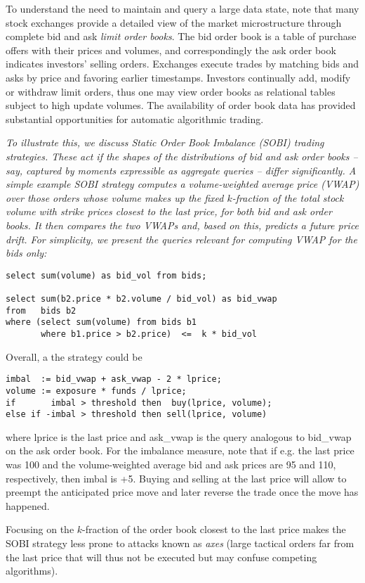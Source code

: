 To understand the need to maintain and query a large data state, note that
many stock exchanges provide a detailed view of the market microstructure
through complete bid and ask {\em limit order books}. The bid order book is a
table of purchase offers with their prices and volumes, and correspondingly the
ask order book indicates investors' selling orders. Exchanges execute trades by
matching bids and asks by price and favoring earlier timestamps. Investors
continually add, modify or withdraw limit orders, thus one may view order books
as relational tables subject to high update volumes. The availability of order
book data has provided substantial opportunities for automatic algorithmic
trading.



\begin{example}\em
To illustrate this, we discuss Static Order Book Imbalance (SOBI) trading
strategies. These act if the shapes of the distributions of bid and ask
order books -- say, captured by moments expressible as aggregate queries --
differ significantly. A simple example SOBI strategy
computes a volume-weighted average price (VWAP) over those
orders whose volume makes up the fixed $k$-fraction of the total stock volume
with strike prices closest to the last price, for both
bid and ask order books. It then compares the two VWAPs and, based on
this, predicts a future price drift.
For simplicity, we present the queries relevant for computing
VWAP for the bids only:
\begin{verbatim}
select sum(volume) as bid_vol from bids;

select sum(b2.price * b2.volume / bid_vol) as bid_vwap
from   bids b2
where (select sum(volume) from bids b1
       where b1.price > b2.price)  <=  k * bid_vol
\end{verbatim}
Overall, a the strategy could be
\begin{verbatim}
imbal  := bid_vwap + ask_vwap - 2 * lprice;
volume := exposure * funds / lprice;
if       imbal > threshold then  buy(lprice, volume);
else if -imbal > threshold then sell(lprice, volume)
\end{verbatim}
where lprice is the last price and
ask\_vwap is the query analogous to bid\_vwap
on the ask order book.
For the imbalance measure, note that if e.g. the last price was 100 and
the volume-weighted average bid and ask prices are 95 and 110, respectively,
then imbal is +5.
Buying and selling at the last price will allow to preempt the
anticipated price move and later reverse the trade once the
move has happened.

Focusing on the $k$-fraction of the order book closest to the last price
makes the SOBI strategy less prone to attacks known as {\em axes}\/ (large
tactical orders far from the last price that will thus not be executed but
may confuse competing algorithms).
\punto
\end{example}


